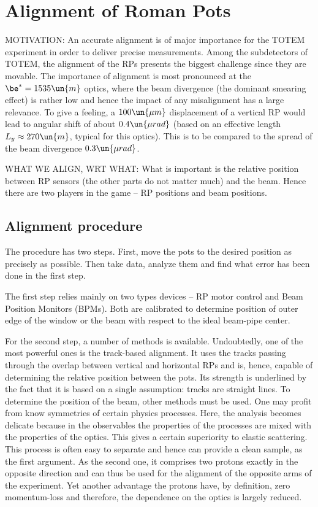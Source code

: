 \def\pmt#1{\hbox{\tt[#1]}}


\chapter[al]{Alignment of Roman Pots}

MOTIVATION: An accurate alignment is of major importance for the TOTEM experiment in order to deliver precise measurements. Among the subdetectors of TOTEM, the alignment of the RPs presents the biggest challenge since they are movable. The importance of alignment is most pronounced at the $\be^* = 1535\un{m}$ optics, where the beam divergence (the dominant smearing effect) is rather low and hence the impact of any misalignment has a large relevance. To give a feeling, a $100\un{\mu m}$ displacement of a vertical RP would lead to angular shift of about $0.4\un{\mu rad}$ (based on an effective length $L_y\approx 270\un{m}$, typical for this optics). This is to be compared to the spread of the beam divergence $0.3\un{\mu rad}$.


WHAT WE ALIGN, WRT WHAT:
What is important is the relative position between RP sensors (the other parts do not matter much) and the beam. Hence there are two players in the game -- RP positions and beam positions.

\section[al proc]{Alignment procedure}
The procedure has two steps. First, move the pots to the desired position as precisely as possible. Then take data, analyze them and find what error has been done in the first step.

The first step relies mainly on two types devices -- RP motor control and Beam Position Monitors (BPMs). Both are calibrated to determine position of outer edge of the window or the beam with respect to the ideal beam-pipe center.

For the second step, a number of methods is available. Undoubtedly, one of the most powerful ones is the track-based alignment. It uses the tracks passing through the overlap between vertical and horizontal RPs and is, hence, capable of determining the relative position between the pots. Its strength is underlined by the fact that it is based on a single assumption: tracks are straight lines. To determine the position of the beam, other methods must be used. One may profit from know symmetries of certain physics processes. Here, the analysis becomes delicate because in the observables the properties of the processes are mixed with the properties of the optics. This gives a certain superiority to elastic scattering. This process is often easy to separate and hence can provide a clean sample, as the first argument. As the second one, it comprises two protons exactly in the opposite direction and can thus be used for the alignment of the opposite arms of the experiment. Yet another advantage the protons have, by definition, zero momentum-loss and therefore, the dependence on the optics is largely reduced.

